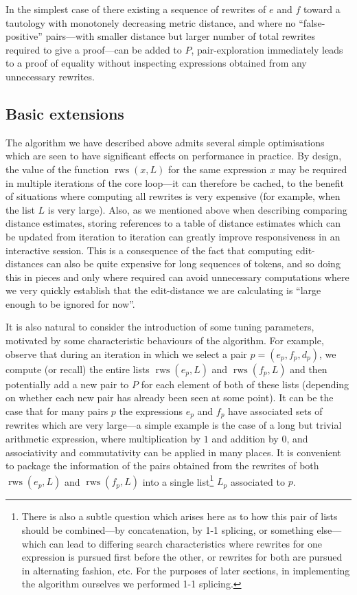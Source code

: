 \documentclass[a4paper]{article}
\DeclareMathOperator{\rws}{rws}
\theoremstyle{plain}
\theoremstyle{definition}
\begin{document}
In the simplest case of there existing a sequence of rewrites of $e$ and $f$ toward a tautology with monotonely decreasing metric distance, and where no ``false-positive'' pairs---with smaller distance but larger number of total rewrites required to give a proof---can be added to $P$, pair-exploration immediately leads to a proof of equality without inspecting expressions obtained from any unnecessary rewrites.

\subsection{Basic extensions}

The algorithm we have described above admits several simple optimisations which are seen to have significant effects on performance in practice. By design, the value of the function $\rws(x, L)$ for the same expression $x$ may be required in multiple iterations of the core loop---it can therefore be cached, to the benefit of situations where computing all rewrites is very expensive (for example, when the list $L$ is very large). Also, as we mentioned above when describing comparing distance estimates, storing references to a table of distance estimates which can be updated from iteration to iteration can greatly improve responsiveness in an interactive session. This is a consequence of the fact that computing edit-distances can also be quite expensive for long sequences of tokens, and so doing this in pieces and only where required can avoid unnecessary computations where we very quickly establish that the edit-distance we are calculating is ``large enough to be ignored for now''.

It is also natural to consider the introduction of some tuning parameters, motivated by some characteristic behaviours of the algorithm. For example, observe that during an iteration in which we select a pair $p = (e_p, f_p, d_p)$, we compute (or recall) the entire lists $\rws(e_p, L)$ and $\rws(f_p, L)$ and then potentially add a new pair to $P$ for each element of both of these lists (depending on whether each new pair has already been seen at some point). It can be the case that for many pairs $p$ the expressions $e_p$ and $f_p$ have associated sets of rewrites which are very large---a simple example is the case of a long but trivial arithmetic expression, where multiplication by $1$ and addition by $0$, and associativity and commutativity can be applied in many places. It is convenient to package the information of the pairs obtained from the rewrites of both $\rws(e_p, L)$ and $\rws(f_p, L)$ into a single list\footnote{There is also a subtle question which arises here as to how this pair of lists should be combined---by concatenation, by 1-1 splicing, or something else---which can lead to differing search characteristics where rewrites for one expression is pursued first before the other, or rewrites for both are pursued in alternating fashion, etc. For the purposes of later sections, in implementing the algorithm ourselves we performed 1-1 splicing.} $L_p$ associated to $p$.
\end{document}
